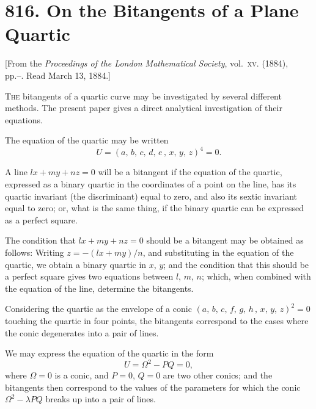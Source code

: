 \documentclass[11pt,a4paper]{book}
\providecommand{\between}{,}
\begin{document}
\newpage
\section*{816. On the Bitangents of a Plane Quartic}

\begin{center}
\small[From the \textit{Proceedings of the London Mathematical Society}, vol.~\textsc{xv}. (1884),\\
pp.--. Read March 13, 1884.]
\end{center}

\bigskip

\noindent
\textsc{The} bitangents of a quartic curve may be investigated by several different methods. The present paper gives a direct analytical investigation of their equations.

The equation of the quartic may be written
\[
U = (a,\,b,\,c,\,d,\,e\,\between\,x,\,y,\,z)^4 = 0.
\]

A line $lx + my + nz = 0$ will be a bitangent if the equation of the quartic, expressed as a binary quartic in the coordinates of a point on the line, has its quartic invariant (the discriminant) equal to zero, and also its sextic invariant equal to zero; or, what is the same thing, if the binary quartic can be expressed as a perfect square.

The condition that $lx + my + nz = 0$ should be a bitangent may be obtained as follows: Writing $z = -(lx + my)/n$, and substituting in the equation of the quartic, we obtain a binary quartic in $x$, $y$; and the condition that this should be a perfect square gives two equations between $l$, $m$, $n$; which, when combined with the equation of the line, determine the bitangents.

Considering the quartic as the envelope of a conic $(a,\,b,\,c,\,f,\,g,\,h\,\between\,x,\,y,\,z)^2 = 0$ touching the quartic in four points, the bitangents correspond to the cases where the conic degenerates into a pair of lines.

We may express the equation of the quartic in the form
\[
U = \Omega^2 - PQ = 0,
\]
where $\Omega = 0$ is a conic, and $P = 0$, $Q = 0$ are two other conics; and the bitangents then correspond to the values of the parameters for which the conic $\Omega^2 - \lambda PQ$ breaks up into a pair of lines.
\end{document}
